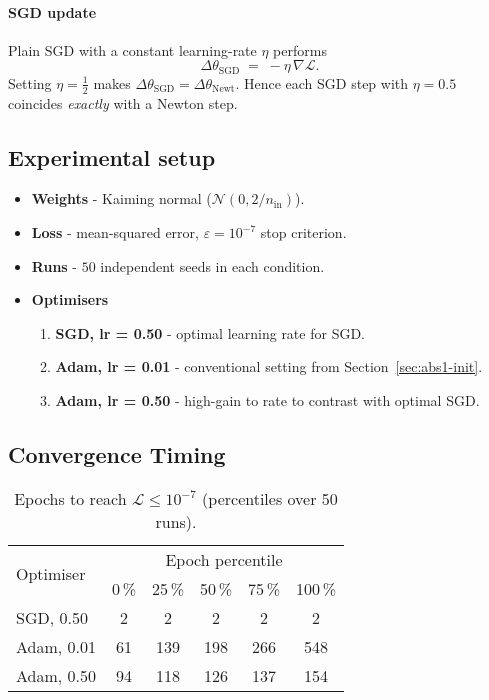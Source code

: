 \paragraph{SGD update}
Plain SGD with a constant learning-rate $\eta$ performs
\[
    \Delta\theta_{\text{SGD}}
    \;=\;
    -\eta\,\nabla\! \mathcal L.
\]
Setting \(\eta=\tfrac12\) makes \(\Delta\theta_{\text{SGD}} =
\Delta\theta_{\text{Newt}}\).  Hence each SGD step with
\(\eta=0.5\) coincides \emph{exactly} with a Newton step.

\subsection*{Experimental setup}
\begin{itemize}
    \item \textbf{Weights} - Kaiming normal ($\mathcal N(0,2/n_\text{in})$).
    \item \textbf{Loss} - mean-squared error, $\varepsilon=10^{-7}$ stop criterion.
    \item \textbf{Runs} - $50$ independent seeds in each condition.
    \item \textbf{Optimisers}  
        \begin{enumerate}
            \item \textbf{SGD, lr = 0.50} - optimal learning rate for SGD.
            \item \textbf{Adam, lr = 0.01} - conventional setting from Section~\ref{sec:abs1-init}.
            \item \textbf{Adam, lr = 0.50} - high-gain to rate to contrast with optimal SGD.
        \end{enumerate}
\end{itemize}

\subsection*{Convergence Timing}

\begin{table}[h]
\centering
\caption{Epochs to reach $\mathcal{L}\le10^{-7}$ (percentiles over 50 runs).}
\label{tab:abs1-opt-conv}
\begin{tabular}{lccccc}
\toprule
\multirow{2}{*}{Optimiser} &
\multicolumn{5}{c}{Epoch percentile} \\
\cmidrule(lr){2-6}
 & 0\,\% & 25\,\% & 50\,\% & 75\,\% & 100\,\% \\
\midrule
SGD,  0.50 & 2   & 2   & 2   & 2   & 2   \\ 
Adam, 0.01 & 61  & 139 & 198 & 266 & 548 \\
Adam, 0.50 & 94  & 118 & 126 & 137 & 154 \\
\bottomrule
\end{tabular}
\end{table}

